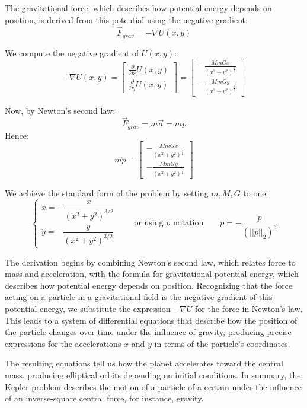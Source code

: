 \documentclass[11pt]{article}
\begin{document}
The gravitational force, which describes how potential energy depends on position, is derived from this potential using the negative gradient:
\[
\vec F_{grav} = - \nabla  U(x,y)
\]

We compute the negative gradient of $U(x,y)$:
\[
-\nabla U(x,y) = 
\begin {bmatrix}
\frac{\partial}{\partial x}U(x,y)\\[15pt]
\frac{\partial}{\partial y}U(x,y)
\end{bmatrix} =
\begin {bmatrix}
-\frac{MmGx}{(x^2+y^2)^ \frac{3}{2}}\\[15pt]
-\frac{MmGy}{(x^2+y^2)^ \frac{3}{2}}
\end{bmatrix} 
\]

Now, by Newton’s second law:
\[
\vec F_{grav} = m \vec a = m \ddot p 
\]
Hence:
\[
m \ddot p = 
\begin {bmatrix}
-\frac{MmGx}{(x^2+y^2)^ \frac{3}{2}}\\[15pt]
-\frac{MmGy}{(x^2+y^2)^ \frac{3}{2}}
\end{bmatrix} 
\]

We achieve the standard form of the problem by setting $m, M, G$ to one:
\[
\begin{cases}
\ddot{x} = -\dfrac{x}{(x^2 + y^2)^{3/2}} \\[10pt]
\ddot{y} = -\dfrac{y}{(x^2 + y^2)^{3/2}}
\end{cases}
\quad \quad \text{or using $p$ notation} \quad \quad
\ddot{p} = - \frac{p}{(||p||_2)^{3}}
\]

The derivation begins by combining Newton's second law, which relates force to mass and acceleration, with the formula for gravitational potential energy, which describes how potential energy depends on position. Recognizing that the force acting on a particle in a gravitational field is the negative gradient of this potential energy, we substitute the expression $- \nabla U$ for the force in Newton’s law. This leads to a system of differential equations that describe how the position of the particle changes over time under the influence of gravity, producing precise expressions for the accelerations $\ddot x$ and $\ddot y$ in terms of the particle's coordinates.

The resulting equations tell us how the planet accelerates toward the central mass, producing elliptical orbits depending on initial conditions. In summary, the Kepler problem describes the motion of a particle of a certain under the influence of an inverse-square central force, for instance, gravity.
\end{document}
